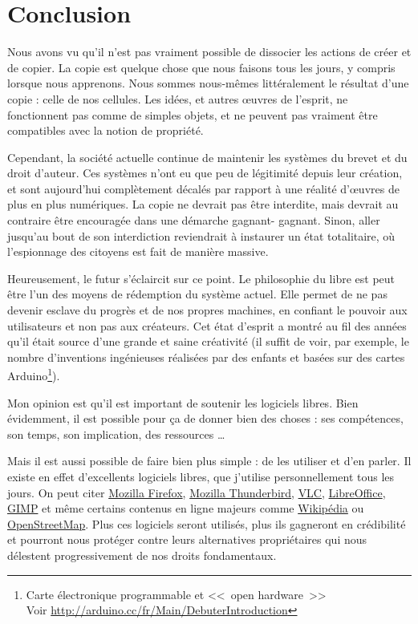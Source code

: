 \chapter*{Conclusion}

Nous avons vu qu'il n'est pas vraiment possible de dissocier les actions de créer et de copier.
La copie est quelque chose que nous faisons tous les jours, y compris lorsque nous apprenons.
Nous sommes nous-mêmes littéralement le résultat d'une copie : celle de nos cellules.
Les idées, et autres œuvres de l'esprit, ne fonctionnent pas comme de simples objets, et ne peuvent pas vraiment être compatibles avec la notion de propriété.

Cependant, la société actuelle continue de maintenir les systèmes du brevet et du droit d'auteur.
Ces systèmes n'ont eu que peu de légitimité depuis leur création, et sont aujourd'hui complètement décalés par rapport à une réalité d'œuvres de plus en plus numériques.
La copie ne devrait pas être interdite, mais devrait au contraire être encouragée dans une démarche gagnant- gagnant.
Sinon, aller jusqu'au bout de son interdiction reviendrait à instaurer un état totalitaire, où l'espionnage des citoyens est fait de manière massive.

Heureusement, le futur s'éclaircit sur ce point.
Le philosophie du libre est peut être l'un des moyens de rédemption du système actuel.
Elle permet de ne pas devenir esclave du progrès et de nos propres machines, en confiant le pouvoir aux utilisateurs et non pas aux créateurs.
Cet état d'esprit a montré au fil des années qu'il était source d'une grande et saine créativité (il suffit de voir, par exemple, le nombre d'inventions ingénieuses réalisées par des enfants et basées sur des cartes Arduino\footnote{Carte électronique programmable et <<~open hardware~>>\\Voir \url{http://arduino.cc/fr/Main/DebuterIntroduction}}).

Mon opinion est qu'il est important de soutenir les logiciels libres.
Bien évidemment, il est possible pour ça de donner bien des choses : ses compétences, son temps, son implication, des ressources \dots{}

Mais il est aussi possible de faire bien plus simple : de les utiliser et d'en parler.
Il existe en effet d'excellents logiciels libres, que j'utilise personnellement tous les jours.
On peut citer \href{https://www.mozilla.org/fr/firefox/new/}{Mozilla Firefox}, \href{https://www.mozilla.org/fr/thunderbird/}{Mozilla Thunderbird}, \href{https://www.videolan.org/vlc/}{VLC}, \href{http://fr.libreoffice.org/}{LibreOffice}, \href{http://www.gimp.org/}{GIMP} et même certains contenus en ligne majeurs comme \href{https://fr.wikipedia.org/}{Wikipédia} ou \href{http://www.openstreetmap.org/}{OpenStreetMap}.
Plus ces logiciels seront utilisés, plus ils gagneront en crédibilité et pourront nous protéger contre leurs alternatives propriétaires qui nous délestent progressivement de nos droits fondamentaux.


